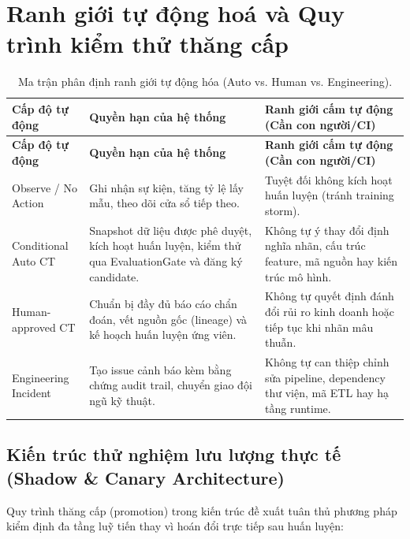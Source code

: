 \section{Ranh giới tự động hoá và Quy trình kiểm thử thăng cấp}

\begin{xltabular}{\linewidth}{@{}L{3.2cm} Y Y@{}}
\caption{Ma trận phân định ranh giới tự động hóa (Auto vs. Human vs. Engineering).}\label{tab:boundaries}\\
\toprule
\textbf{Cấp độ tự động} & \textbf{Quyền hạn của hệ thống} & \textbf{Ranh giới cấm tự động (Cần con người/CI)} \\
\midrule
\endfirsthead
\toprule
\textbf{Cấp độ tự động} & \textbf{Quyền hạn của hệ thống} & \textbf{Ranh giới cấm tự động (Cần con người/CI)} \\
\midrule
\endhead
Observe / No Action & Ghi nhận sự kiện, tăng tỷ lệ lấy mẫu, theo dõi cửa sổ tiếp theo. & Tuyệt đối không kích hoạt huấn luyện (tránh training storm). \\
\addlinespace
Conditional Auto CT & Snapshot dữ liệu được phê duyệt, kích hoạt huấn luyện, kiểm thử qua EvaluationGate và đăng ký candidate. & Không tự ý thay đổi định nghĩa nhãn, cấu trúc feature, mã nguồn hay kiến trúc mô hình. \\
\addlinespace
Human-approved CT & Chuẩn bị đầy đủ báo cáo chẩn đoán, vết nguồn gốc (lineage) và kế hoạch huấn luyện ứng viên. & Không tự quyết định đánh đổi rủi ro kinh doanh hoặc tiếp tục khi nhãn mâu thuẫn. \\
\addlinespace
Engineering Incident & Tạo issue cảnh báo kèm bằng chứng audit trail, chuyển giao đội ngũ kỹ thuật. & Không tự can thiệp chỉnh sửa pipeline, dependency thư viện, mã ETL hay hạ tầng runtime. \\
\bottomrule
\end{xltabular}

\subsection{Kiến trúc thử nghiệm lưu lượng thực tế (Shadow \& Canary Architecture)}\label{subsec:shadow-canary}

Quy trình thăng cấp (promotion) trong kiến trúc đề xuất tuân thủ phương pháp kiểm định đa tầng luỹ tiến thay vì hoán đổi trực tiếp sau huấn luyện:

